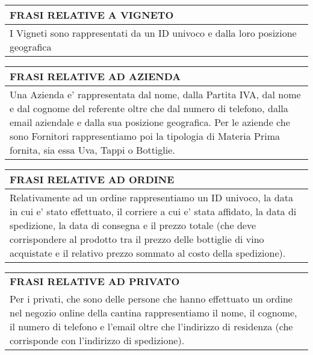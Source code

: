 \begin{center}
	\vspace{0.5cm}
	
	\begin{tabular}{P{16cm}}
		\toprule
		 \textbf {\large {FRASI RELATIVE A VIGNETO}} \\
		\midrule
		I Vigneti sono rappresentati da un ID univoco e dalla loro posizione geografica\\
		\bottomrule
	\end{tabular}
	
	\vspace{0.5cm}
	
	\begin{tabular}{P{16cm}}
		\toprule
		 \textbf {\large {FRASI RELATIVE AD AZIENDA}} \\
		\midrule

		Una Azienda e' rappresentata dal nome, dalla Partita IVA, dal nome e dal cognome del referente oltre che dal numero di telefono, dalla email aziendale e dalla sua posizione geografica. Per le aziende che sono Fornitori rappresentiamo poi la tipologia di Materia Prima fornita, sia essa Uva, Tappi o Bottiglie.\\
		\bottomrule
	\end{tabular}
	
	\vspace{0.5cm}
	
	\begin{tabular}{P{16cm}}
		\toprule
		 \textbf {\large {FRASI RELATIVE AD ORDINE}} \\
		\midrule
		Relativamente ad un ordine rappresentiamo un ID univoco, la data in cui e' stato effettuato, il corriere a cui e' stata affidato, la data di spedizione, la data di consegna e il prezzo totale (che deve corrispondere al prodotto tra il prezzo delle bottiglie di vino acquistate e il relativo prezzo sommato al costo della spedizione).\\
		\bottomrule
	\end{tabular}
	
	\vspace{0.5cm}
	
	\begin{tabular}{P{16cm}}
		\toprule
		 \textbf {\large {FRASI RELATIVE AD PRIVATO}} \\
		Per i privati, che sono delle persone che hanno effettuato un ordine nel negozio online della cantina rappresentiamo il nome, il cognome, il numero di telefono e l'email oltre che l'indirizzo di residenza (che corrisponde con l'indirizzo di spedizione).\\
		\bottomrule
	\end{tabular}
	

\end{center}
